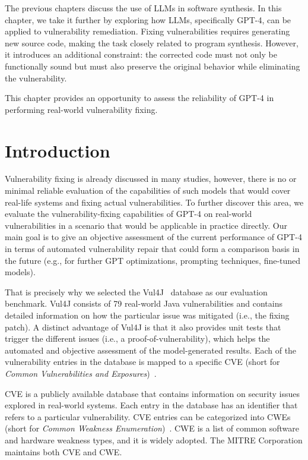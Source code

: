The previous chapters discuss the use of LLMs in software synthesis.
In this chapter, we take it further by exploring how LLMs, specifically GPT-4, can be applied to vulnerability remediation.
Fixing vulnerabilities requires generating new source code, making the task closely related to program synthesis.
However, it introduces an additional constraint: the corrected code must not only be functionally sound but must also preserve the original behavior while eliminating the vulnerability.

This chapter provides an opportunity to assess the reliability of GPT-4 in performing real-world vulnerability fixing.

\section{Introduction}
\label{sec:intro}

Vulnerability fixing is already discussed in many studies, however, there is no or minimal reliable evaluation of the capabilities of such models that would cover real-life systems and fixing actual vulnerabilities.
To further discover this area, we evaluate the vulnerability-fixing capabilities of GPT-4 on real-world vulnerabilities in a scenario that would be applicable in practice directly.
Our main goal is to give an objective assessment of the current performance of GPT-4 in terms of automated vulnerability repair that could form a comparison basis in the future (e.g., for further GPT optimizations, prompting techniques, fine-tuned models).

That is precisely why we selected the Vul4J~\cite{vul4j} database as our evaluation benchmark.
Vul4J consists of 79 real-world Java vulnerabilities and contains detailed information on how the particular issue was mitigated (i.e., the fixing patch).
A distinct advantage of Vul4J is that it also provides unit tests that trigger the different issues (i.e., a proof-of-vulnerability), which helps the automated and objective assessment of the model-generated results.
Each of the vulnerability entries in the database is mapped to a specific CVE (short for \textit{Common Vulnerabilities and Exposures})~\cite{cve}.

CVE is a publicly available database that contains information on security issues explored in real-world systems.
Each entry in the database has an identifier %
that refers to a particular vulnerability.
CVE entries can be categorized into CWEs (short for \textit{Common Weakness Enumeration})~\cite{cwe}.
CWE is a list of common software and hardware weakness types, and it is widely adopted.
The MITRE Corporation maintains both CVE and CWE.

